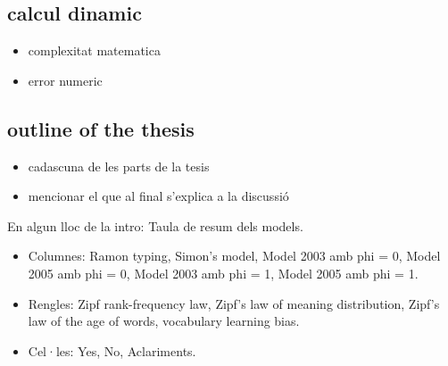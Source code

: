 \subsection{calcul dinamic}
\begin{itemize}
\item complexitat matematica
\item error numeric
\end{itemize}
\subsection{outline of the thesis}
\begin{itemize}
\item cadascuna de les parts de la tesis
\item mencionar el que al final s'explica a la discussió
\end{itemize}

En algun lloc de la intro: Taula de resum dels models.
\begin{itemize}
\item Columnes: Ramon typing, Simon's model, Model 2003 amb phi = 0, Model 2005 amb phi = 0, Model 2003 amb phi = 1, Model 2005 amb phi = 1.
\item Rengles: Zipf rank-frequency law, Zipf's law of meaning distribution, Zipf's law of the age of words, vocabulary learning bias.
\item Cel·les: Yes, No, Aclariments.
\end{itemize}

